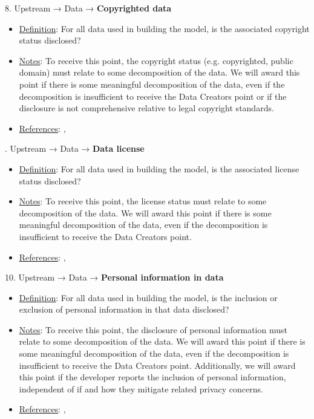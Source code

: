 8. Upstream → Data → \textbf{Copyrighted data}
\vspace{-\parskip}
\begin{itemize}
	\item
	\underline{Definition}: For all data used in building the model, is the associated copyright status disclosed?
	\item
	\underline{Notes}: To receive this point, the copyright status (e.g. copyrighted, public domain) must relate to some decomposition of the data. We will award this point if there is some meaningful decomposition of the data, even if the decomposition is insufficient to receive the Data Creators point or if the disclosure is not comprehensive relative to legal copyright standards.
	\item
	\underline{References}: \citet{bandy2021addressing}, \citet{genlaw2023}
\end{itemize}


. Upstream → Data → \textbf{Data license}
\vspace{-\parskip}
\begin{itemize}
	\item
	\underline{Definition}: For all data used in building the model, is the associated license status disclosed?
	\item
	\underline{Notes}: To receive this point, the license status must relate to some decomposition of the data. We will award this point if there is some meaningful decomposition of the data, even if the decomposition is insufficient to receive the Data Creators point.
	\item
	\underline{References}: \citet{bandy2021addressing}, \citet{genlaw2023}
\end{itemize}


10. Upstream → Data → \textbf{Personal information in data}
\vspace{-\parskip}
\begin{itemize}
	\item
	\underline{Definition}: For all data used in building the model, is the inclusion or exclusion of personal information in that data disclosed?
	\item
	\underline{Notes}: To receive this point, the disclosure of personal information must relate to some decomposition of the data. We will award this point if there is some meaningful decomposition of the data, even if the decomposition is insufficient to receive the Data Creators point. Additionally, we will award this point if the developer reports the inclusion of personal information, independent of if and how they mitigate related privacy concerns.
	\item
	\underline{References}: \citet{west2019data}, \citet{brown2022does}
\end{itemize}


